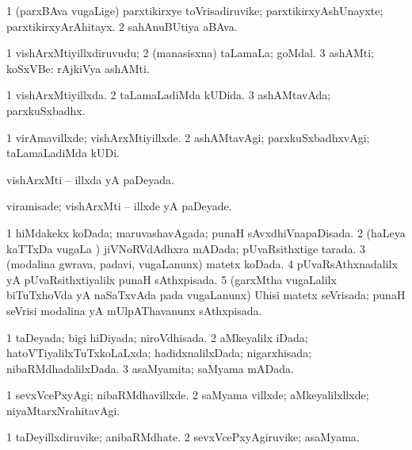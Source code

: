 {{\bentry
{} 
\gl{\nA}
\expl{}
\bmng
\bnum
\num{1} (parxBAva \mo vugaLige) parxtikirxye toVrisadiruvike; parxtikirxyAshUnayxte; parxtikirxyArAhitayx. 
\num{2} sahAnuBUtiya aBAva. 
\enum
\emng
\eentry

\bentry
{} 
\gl{\nA}
\expl{}
\bmng
\bnum
\num{1} vishArxMtiyillxdiruvudu; 
\num{2} (manasisxna) taLamaLa; goMdal. 
\num{3} ashAMti; koSxVBe:  rAjkiVya ashAMti. 
\enum
\emng
\eentry

\bentry
{} 
\gl{\gu}
\expl{}
\bmng
\bnum
\num{1} vishArxMtiyillxda. 
\num{2} taLamaLadiMda kUDida. 
\num{3} ashAMtavAda; parxkuSxbadhx. 
\enum
\emng
\eentry

\bentry
{} 
\gl{\kirxvi}
\expl{}
\bmng
\bnum
\num{1} virAmavillxde; vishArxMtiyillxde. 
\num{2} ashAMtavAgi; parxkuSxbadhxvAgi; taLamaLadiMda kUDi. 
\enum
\emng
\eentry

\bentry
{} 
\gl{\gu}
\expl{}
\bmng
vishArxMti -- illxda yA paDeyada. 
\emng
\eentry

\bentry
{} 
\gl{\kirxvi}
\expl{}
\bmng
viramisade; vishArxMti -- illxde yA paDeyade. 
\emng
\eentry

\bentry
{} 
\gl{\gu}
\expl{}
\bmng
\bnum
\num{1} hiMdakekx koDada; maruvashavAgada; punaH sAvxdhiVnapaDisada. 
\num{2} (haLeya kaTTxDa \mo vugaLa \vi) jiVNoRVdAdhxra mADada; pUvaRsithxtige tarada. 
\num{3} (modalina gwrava, padavi, \mo vugaLanunx) matetx koDada. 
\num{4} pUvaRsAthxnadalilx yA pUvaRsithxtiyalilx punaH sAthxpisada. 
\num{5} (garxMtha \mo vugaLalilx biTuTxhoVda yA naSaTxvAda pada \mo vugaLanunx) Uhisi matetx seVrisada; punaH seVrisi modalina yA mUlpAThavanunx sAthxpisada. 
\enum
\emng
\eentry

\bentry
{} 
\gl{\gu}
\expl{}
\bmng
\bnum
\num{1} taDeyada; bigi hiDiyada; niroVdhisada. 
\num{2} aMkeyalilx iDada; hatoVTiyalilxTuTxkoLaLxda; hadidxnalilxDada; nigarxhisada; nibaRMdhadalilxDada. 
\num{3} asaMyamita; saMyama mADada. 
\enum
\emng
\eentry

\bentry
{} 
\gl{\kirxvi}
\expl{}
\bmng
\bnum
\num{1} sevxVcePxyAgi; nibaRMdhavillxde. 
\num{2} saMyama villxde; aMkeyalilxllxde; niyaMtarxNrahitavAgi. 
\enum
\emng
\eentry

\bentry
{} 
\gl{\nA}
\expl{}
\bmng
\bnum
\num{1} taDeyillxdiruvike; anibaRMdhate. 
\num{2} sevxVcePxyAgiruvike; asaMyama. 
\enum
\emng
\eentry

}}
